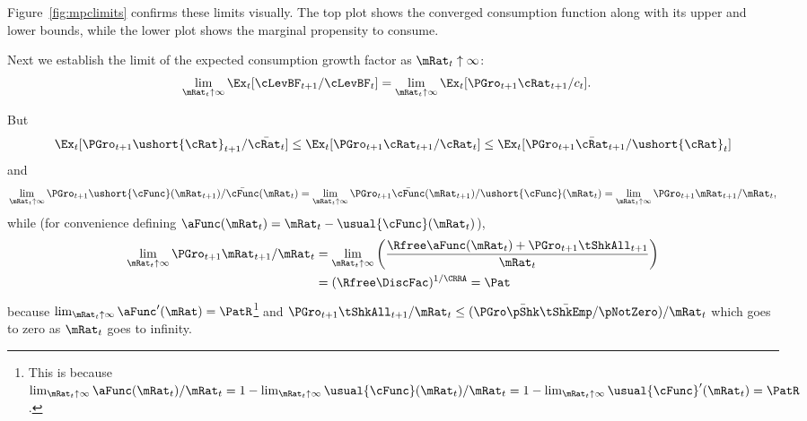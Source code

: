 \documentclass[BufferStockTheory]{subfiles}
\begin{document}
Figure~\ref{fig:mpclimits} confirms these limits visually.  The top
plot shows the converged consumption function along with its upper and lower bounds,
while the lower plot shows the marginal propensity to consume.

\renewcommand{\figFile}{mpclimits}
\hypertarget{\figFile}{}


\renewcommand{\figFile}{cFuncBounds}
\hypertarget{\figFile}{}


Next we establish the limit of the expected consumption growth factor
as $\mRat_{t} \uparrow \infty$:
\begin{align*}
  \lim_{\mRat_{t} \uparrow \infty} \Ex_{t}[
  \cLevBF_{t+1}/\cLevBF_{t}]  & = \lim_{\mRat_{t} \uparrow \infty} \Ex_{t}[
                                {\PGro}_{t+1} {\cRat}_{t+1}/c_{t}]. 
\end{align*}

But
\begin{align*}
  \Ex_{t}[{\PGro}_{t+1} {\ushort{\cRat}}_{t+1}/\bar{\cRat_{t}}] \leq \Ex_{t}[{\PGro}_{t+1} {\cRat}_{t+1}/\cRat_{t}] \leq \Ex_{t}[{\PGro}_{t+1} {\bar{\cRat}}_{t+1}/\ushort{\cRat}_{t}]
\end{align*}
and
\begin{equation*}  \label{eq:xttoinfty}
  \lim_{\mRat_t \uparrow \infty} \PGro_{t+1}\ushort{\cFunc}(\mRat_{t+1})/\bar{\cFunc}(\mRat_t) =
  \lim_{\mRat_{t} \uparrow \infty} \PGro_{t+1}\bar{\cFunc}(\mRat_{t+1})/\ushort{\cFunc}(\mRat_t) =
  \lim_{\mRat_{t} \uparrow \infty}\PGro_{t+1} \mRat_{t+1}/\mRat_t,  
\end{equation*}
while (for convenience defining $\aFunc(\mRat_{t})=\mRat_{t}-\usual{\cFunc}(\mRat_{t})$), \hypertarget{xtp1toinfty}{}
\begin{align}  \label{eq:xtp1toinfty}
  \lim_{\mRat_{t} \uparrow \infty} \PGro_{t+1} \mRat_{t+1}/\mRat_t  & = \lim_{\mRat_{t} \uparrow \infty}
                                                                  \left(\frac{\Rfree \aFunc(\mRat_t)+{\PGro}_{t+1}\tShkAll_{t+1}}{\mRat_t}\right)
  \\  & = (\Rfree \DiscFac)^{1/\CRRA} = \Pat \notag
\end{align}
because $\lim_{\mRat_{t}\uparrow \infty} \aFunc^{\prime}(\mRat)=\PatR$\footnote{This is because $\lim_{\mRat_{t}\uparrow \infty} \aFunc(\mRat_{t})/\mRat_{t}=1-\lim_{\mRat_{t}\uparrow \infty} \usual{\cFunc}(\mRat_{t})/\mRat_{t}=1-\lim_{\mRat_{t}\uparrow \infty}\usual{\cFunc}^{\prime}(\mRat_{t})=\PatR$.} and
$\PGro_{t+1}\tShkAll_{t+1}/\mRat_{t} \leq (\PGro \bar{\pShk} \bar{\tShkEmp}/\pNotZero )/\mRat_{t}$ which
goes to zero as $\mRat_{t}$ goes to infinity.
\end{document}
